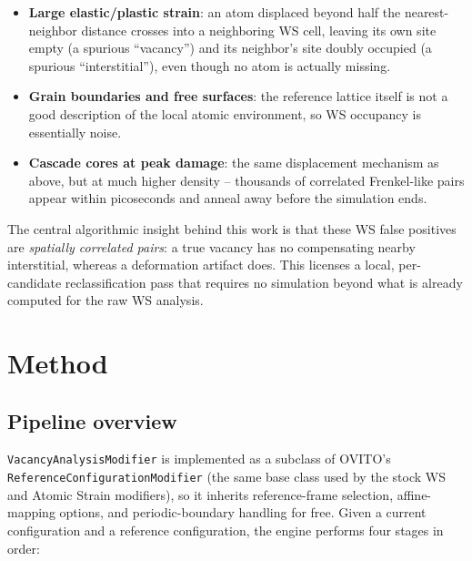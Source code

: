 \documentclass[11pt]{article}
\newcommand{\code}[1]{\texttt{#1}}
\begin{document}
\begin{itemize}[nosep]
    \item \textbf{Large elastic/plastic strain}: an atom displaced beyond half the nearest-neighbor
    distance crosses into a neighboring WS cell, leaving its own site empty (a spurious
    ``vacancy'') and its neighbor's site doubly occupied (a spurious ``interstitial''), even though
    no atom is actually missing.
    \item \textbf{Grain boundaries and free surfaces}: the reference lattice itself is not a good
    description of the local atomic environment, so WS occupancy is essentially noise.
    \item \textbf{Cascade cores at peak damage}: the same displacement mechanism as above, but at
    much higher density -- thousands of correlated Frenkel-like pairs appear within
    picoseconds and anneal away before the simulation ends.
\end{itemize}

The central algorithmic insight behind this work is that these WS false positives are
\emph{spatially correlated pairs}: a true vacancy has no compensating nearby interstitial, whereas a
deformation artifact does. This licenses a local, per-candidate reclassification pass that requires
no simulation beyond what is already computed for the raw WS analysis.

\section{Method}

\subsection{Pipeline overview}

\code{VacancyAnalysisModifier} is implemented as a subclass of OVITO's
\code{ReferenceConfigurationModifier} (the same base class used by the stock WS and Atomic Strain
modifiers), so it inherits reference-frame selection, affine-mapping options, and periodic-boundary
handling for free. Given a current configuration and a reference configuration, the engine performs
four stages in order:
\end{document}
